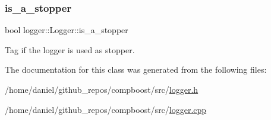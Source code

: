 \subsubsection{\texorpdfstring{is\+\_\+a\+\_\+stopper}{is\_a\_stopper}}
{\footnotesize\ttfamily bool logger\+::\+Logger\+::is\+\_\+a\+\_\+stopper\hspace{0.3cm}{\ttfamily [protected]}}



Tag if the logger is used as stopper. 



The documentation for this class was generated from the following files\+:\begin{DoxyCompactItemize}
\item 
/home/daniel/github\+\_\+repos/compboost/src/\hyperlink{logger_8h}{logger.\+h}\item 
/home/daniel/github\+\_\+repos/compboost/src/\hyperlink{logger_8cpp}{logger.\+cpp}\end{DoxyCompactItemize}
